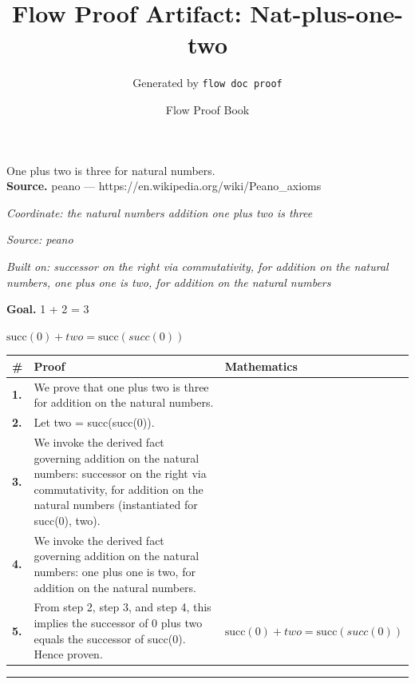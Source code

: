 \documentclass[11pt]{article}
\title{Flow Proof Artifact: Nat-plus-one-two}
\author{Generated by \texttt{flow doc proof}}
\date{Flow Proof Book}
\theoremstyle{definition}
\begin{document}
\maketitle
One plus two is three for natural numbers.\\[0.5em]
\textbf{Source.} peano — https://en.wikipedia.org/wiki/Peano\_axioms\\[0.5em]
\bigskip
{}\par
\smallskip\noindent\textit{Coordinate: the natural numbers \cdot addition \cdot one plus two is three}\par
\smallskip\noindent\textit{Source: peano}\par
\smallskip\noindent\textit{Built on: successor on the right via commutativity, for addition on the natural numbers, one plus one is two, for addition on the natural numbers}\par
\medskip
\noindent\textbf{Goal.} 1 + 2 = 3\par
\noindent$\displaystyle \mathrm{succ}(0) + two = \mathrm{succ}(succ(0))$\par
\medskip
\noindent
\begin{tabular}{@{} >{\raggedright\arraybackslash}p{} >{\raggedright\arraybackslash}p{} >{\raggedleft\arraybackslash}p{} @{}}
\textbf{\#} & \textbf{Proof} & \textbf{Mathematics} \\
\midrule
\textbf{1.} & We prove that one plus two is three for addition on the natural numbers. & \\[0.45em]
\textbf{2.} & Let two = succ(succ(0)). & \\[0.45em]
\textbf{3.} & We invoke the derived fact governing addition on the natural numbers: successor on the right via commutativity, for addition on the natural numbers (instantiated for succ(0), two). & \\[0.45em]
\textbf{4.} & We invoke the derived fact governing addition on the natural numbers: one plus one is two, for addition on the natural numbers. & \\[0.45em]
\textbf{5.} & From step 2, step 3, and step 4, this implies the successor of 0 plus two equals the successor of succ(0). Hence proven. & $\displaystyle \mathrm{succ}(0) + two = \mathrm{succ}(succ(0))$ \\[0.45em]
\bottomrule
\end{tabular}
\label{thm:Nat-addition-one_plus_two_is_three}
\par\medskip\hrule
\end{document}
